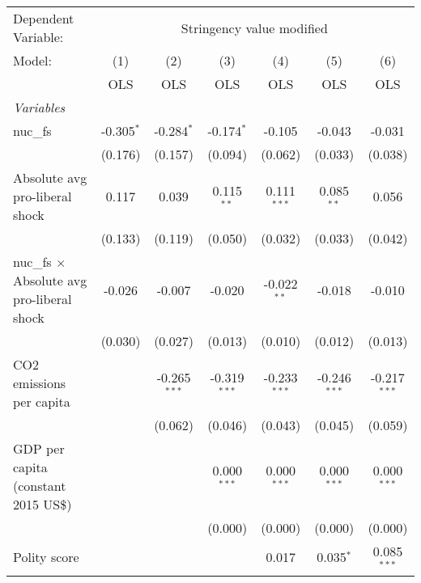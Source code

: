 
\begingroup
\centering
\begin{tabular}{lcccccc}
   \toprule
   Dependent Variable: & \multicolumn{6}{c}{Stringency value modified}\\
   Model:                                            & (1)          & (2)            & (3)            & (4)            & (5)            & (6)\\  
                                                     &  OLS         & OLS            & OLS            & OLS            & OLS            & OLS\\  
   \midrule
   \emph{Variables}\\
   nuc\_fs                                           & -0.305$^{*}$ & -0.284$^{*}$   & -0.174$^{*}$   & -0.105         & -0.043         & -0.031\\   
                                                     & (0.176)      & (0.157)        & (0.094)        & (0.062)        & (0.033)        & (0.038)\\   
   Absolute avg pro-liberal shock                    & 0.117        & 0.039          & 0.115$^{**}$   & 0.111$^{***}$  & 0.085$^{**}$   & 0.056\\   
                                                     & (0.133)      & (0.119)        & (0.050)        & (0.032)        & (0.033)        & (0.042)\\   
   nuc\_fs $\times$ Absolute avg pro-liberal shock   & -0.026       & -0.007         & -0.020         & -0.022$^{**}$  & -0.018         & -0.010\\   
                                                     & (0.030)      & (0.027)        & (0.013)        & (0.010)        & (0.012)        & (0.013)\\   
   CO2 emissions per capita                          &              & -0.265$^{***}$ & -0.319$^{***}$ & -0.233$^{***}$ & -0.246$^{***}$ & -0.217$^{***}$\\   
                                                     &              & (0.062)        & (0.046)        & (0.043)        & (0.045)        & (0.059)\\   
   GDP per capita (constant 2015 US\$)               &              &                & 0.000$^{***}$  & 0.000$^{***}$  & 0.000$^{***}$  & 0.000$^{***}$\\   
                                                     &              &                & (0.000)        & (0.000)        & (0.000)        & (0.000)\\   
   Polity score                                      &              &                &                & 0.017          & 0.035$^{*}$    & 0.085$^{***}$\\   

\end{tabular}
